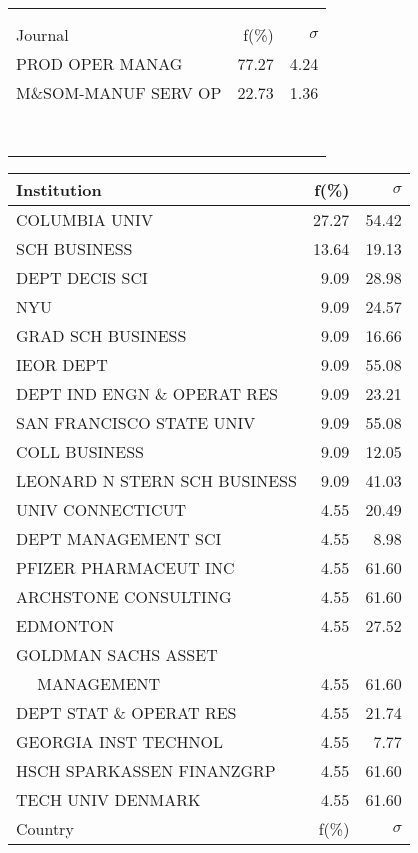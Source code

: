 \documentclass[a4paper,11pt]{report}
\begin{document}
\begin{landscape}
\begin{table}[!ht]
{\begin{tabular}{|l r  r|}
 &  & \\
 &  & \\
\hline
\hline
Journal & f(\%) & $\sigma$\\
\hline
PROD OPER MANAG & 77.27 & 4.24\\
M\&SOM-MANUF SERV OP & 22.73 & 1.36\\
 &  & \\
 &  & \\
 &  & \\
 &  & \\
 &  & \\
 &  & \\
 &  & \\
 &  & \\
\hline
\end{tabular}
}
{\scriptsize\begin{tabular}{|l r r|}
\hline
Institution & f(\%) & $\sigma$\\
\hline
COLUMBIA UNIV & 27.27 & 54.42\\
SCH BUSINESS & 13.64 & 19.13\\
DEPT DECIS SCI & 9.09 & 28.98\\
NYU & 9.09 & 24.57\\
GRAD SCH BUSINESS & 9.09 & 16.66\\
IEOR DEPT & 9.09 & 55.08\\
DEPT IND ENGN \& OPERAT RES & 9.09 & 23.21\\
SAN FRANCISCO STATE UNIV & 9.09 & 55.08\\
COLL BUSINESS & 9.09 & 12.05\\
LEONARD N STERN SCH BUSINESS & 9.09 & 41.03\\
UNIV CONNECTICUT & 4.55 & 20.49\\
DEPT MANAGEMENT SCI & 4.55 & 8.98\\
PFIZER PHARMACEUT INC & 4.55 & 61.60\\
ARCHSTONE CONSULTING & 4.55 & 61.60\\
EDMONTON & 4.55 & 27.52\\
GOLDMAN SACHS ASSET &  & \\
$\quad$ MANAGEMENT & 4.55 & 61.60\\
DEPT STAT \& OPERAT RES & 4.55 & 21.74\\
GEORGIA INST TECHNOL & 4.55 & 7.77\\
HSCH SPARKASSEN FINANZGRP & 4.55 & 61.60\\
TECH UNIV DENMARK & 4.55 & 61.60\\
\hline
\hline
Country & f(\%) & $\sigma$\\

\end{tabular}}
\end{table}
\end{landscape}
\end{document}

